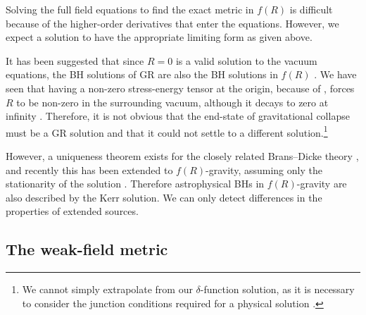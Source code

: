 Solving the full field equations to find the exact metric in $f(R)$ is difficult because of the higher-order derivatives that enter the equations. However, we expect a solution to have the appropriate limiting form as given above.

It has been suggested that since $R = 0$ is a valid solution to the vacuum equations, the BH solutions of GR are also the BH solutions in $f(R)$ \citep{Psaltis2008, Barausse2008}. We have seen that having a non-zero stress-energy tensor at the origin, because of , forces $R$ to be non-zero in the surrounding vacuum, although it decays to zero at infinity \citep{Olmo2007c}. Therefore, it is not obvious that the end-state of gravitational collapse must be a GR solution and that it could not settle to a different solution.\footnote{We cannot simply extrapolate from our $\delta$-function solution, as it is necessary to consider the junction conditions required for a physical solution \citep{Deruelle2008}.}

However, a uniqueness theorem exists for the closely related Brans--Dicke theory \citep{Hawking1972a, Bekenstein1978, Thorne1971, Scheel1995}, and recently this has been extended to $f(R)$-gravity, assuming only the stationarity of the solution \citep{Sotiriou2011}. Therefore astrophysical BHs in $f(R)$-gravity are also described by the Kerr solution. We can only detect differences in the properties of extended sources.

\subsection{The weak-field metric}


